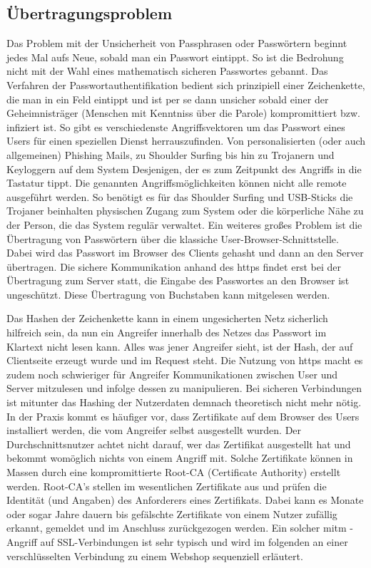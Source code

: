 \subsection{Übertragungsproblem}
Das Problem mit der Unsicherheit von Passphrasen oder Passwörtern beginnt jedes Mal aufs Neue, sobald man ein Passwort eintippt. So ist die Bedrohung nicht mit der Wahl eines mathematisch sicheren Passwortes gebannt. Das Verfahren der Passwortauthentifikation bedient sich prinzipiell einer Zeichenkette, die man in ein Feld eintippt und ist per se dann unsicher sobald einer der Geheimnisträger (Menschen mit Kenntniss über die Parole) kompromittiert bzw. infiziert ist. So gibt es verschiedenste Angriffsvektoren um das Passwort eines Users für einen speziellen Dienst herrauszufinden. Von personalisierten (oder auch allgemeinen) Phishing Mails, zu Shoulder Surfing bis hin zu Trojanern und Keyloggern auf dem System Desjenigen, der es zum Zeitpunkt des Angriffs in die Tastatur tippt. Die genannten Angriffsmöglichkeiten können nicht alle remote ausgeführt werden. So benötigt es für das Shoulder Surfing und USB-Sticks die Trojaner beinhalten physischen Zugang zum System oder die körperliche Nähe zu der Person, die das System regulär verwaltet. Ein weiteres großes Problem ist die Übertragung von Passwörtern über die klassiche User-Browser-Schnittstelle. Dabei wird das Passwort im Browser des Clients gehasht und dann an den Server übertragen. Die sichere Kommunikation anhand des \ac{https} findet erst bei der Übertragung zum Server statt, die Eingabe des Passwortes an den Browser ist ungeschützt. Diese Übertragung von Buchstaben kann mitgelesen werden.

Das Hashen der Zeichenkette kann in einem ungesicherten Netz sicherlich hilfreich sein, da nun ein Angreifer innerhalb des Netzes das Passwort im Klartext nicht lesen kann. Alles was jener Angreifer sieht, ist der Hash, der auf Clientseite erzeugt wurde und im Request steht. Die Nutzung von \ac{https} macht es zudem noch schwieriger für Angreifer Kommunikationen zwischen User und Server mitzulesen und infolge dessen zu manipulieren. Bei sicheren Verbindungen ist mitunter das Hashing der Nutzerdaten demnach theoretisch nicht mehr nötig. In der Praxis kommt es häufiger vor, dass Zertifikate auf dem Browser des Users installiert werden, die vom Angreifer selbst ausgestellt wurden. Der Durchschnittsnutzer achtet nicht darauf, wer das Zertifikat ausgestellt hat und bekommt womöglich nichts von einem Angriff mit. Solche Zertifikate können in Massen durch eine kompromittierte Root-CA (Certificate Authority) erstellt werden. Root-CA's stellen im wesentlichen Zertifikate aus und prüfen die Identität (und Angaben) des Anforderers eines Zertifikats. Dabei kann es Monate oder sogar Jahre dauern bis gefälschte Zertifikate von einem Nutzer zufällig erkannt, gemeldet und im Anschluss zurückgezogen werden. Ein solcher \ac{mitm} - Angriff auf SSL-Verbindungen ist sehr typisch und wird im folgenden an einer verschlüsselten Verbindung zu einem Webshop sequenziell erläutert.

